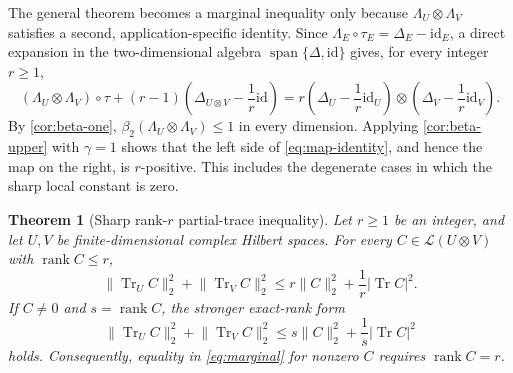 \documentclass[11pt,reqno]{amsart}
\newtheorem{theorem}{Theorem}[section]
\theoremstyle{remark}
\DeclareMathOperator{\Tr}{Tr}
\DeclareMathOperator{\rank}{rank}
\newcommand{\id}{\mathrm{id}}
\newcommand{\cL}{\mathcal L}
\newcommand{\norm}[1]{\lVert #1\rVert}
\newcommand{\abs}[1]{\lvert #1\rvert}
\begin{document}
The general theorem becomes a marginal inequality only because
$\Lambda_U\otimes\Lambda_V$ satisfies a second, application-specific
identity.
Since $\Lambda_E\circ\tau_E=\Delta_E-\id_E$, a direct expansion in the
two-dimensional algebra $\operatorname{span}\{\Delta,\id\}$ gives, for every
integer $r\ge1$,
\begin{equation}
\label{eq:map-identity}
  (\Lambda_U\otimes\Lambda_V)\circ\tau
  +(r-1)\left(\Delta_{U\otimes V}-\frac1r\id\right)
  =
  r\left(\Delta_U-\frac1r\id_U\right)
   \otimes\left(\Delta_V-\frac1r\id_V\right).
\end{equation}
By \cref{cor:beta-one}, $\beta_2(\Lambda_U\otimes\Lambda_V)\le1$ in every
dimension.  Applying \cref{cor:beta-upper} with $\gamma=1$ shows that the
left side of \cref{eq:map-identity}, and hence the map on the right, is
$r$-positive.  This includes the degenerate cases in which the sharp local
constant is zero.

\begin{theorem}[Sharp rank-$r$ partial-trace inequality]
\label{thm:marginal}
Let $r\ge1$ be an integer, and let $U,V$ be finite-dimensional complex
Hilbert spaces.  For every
$C\in\cL(U\otimes V)$ with $\rank C\le r$,
\begin{equation}
\label{eq:marginal}
  \norm{\Tr_U C}_2^2+\norm{\Tr_V C}_2^2
  \le r\norm C_2^2+\frac1r\abs{\Tr C}^2.
\end{equation}
If $C\ne0$ and $s=\rank C$, the stronger exact-rank form
\begin{equation}
\label{eq:exact-rank}
  \norm{\Tr_U C}_2^2+\norm{\Tr_V C}_2^2
  \le s\norm C_2^2+\frac1s\abs{\Tr C}^2
\end{equation}
holds.  Consequently, equality in \cref{eq:marginal} for nonzero $C$
requires $\rank C=r$.
\end{theorem}
\end{document}
